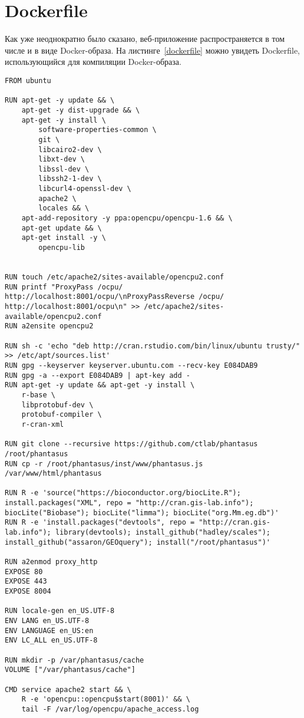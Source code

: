 \documentclass[specification,annotation]{itmo-student-thesis}
\begin{document}
\chapter{Dockerfile}
Как уже неоднократно было сказано, веб-приложение распространяется в том числе и в виде Docker-образа. На листинге~\ref{dockerfile} можно увидеть Dockerfile, использующийся для компиляции Docker-образа.
\begin{lstlisting}[float=!h,caption={Dockerfile для Docker-образа веб-приложения phantasus},label={dockerfile}]
FROM ubuntu
    
RUN apt-get -y update && \
    apt-get -y dist-upgrade && \
    apt-get -y install \
        software-properties-common \
        git \
        libcairo2-dev \
        libxt-dev \
        libssl-dev \
        libssh2-1-dev \
        libcurl4-openssl-dev \
        apache2 \
        locales && \
    apt-add-repository -y ppa:opencpu/opencpu-1.6 && \
    apt-get update && \
    apt-get install -y \
        opencpu-lib


RUN touch /etc/apache2/sites-available/opencpu2.conf
RUN printf "ProxyPass /ocpu/ http://localhost:8001/ocpu/\nProxyPassReverse /ocpu/ http://localhost:8001/ocpu\n" >> /etc/apache2/sites-available/opencpu2.conf
RUN a2ensite opencpu2

RUN sh -c 'echo "deb http://cran.rstudio.com/bin/linux/ubuntu trusty/" >> /etc/apt/sources.list'
RUN gpg --keyserver keyserver.ubuntu.com --recv-key E084DAB9
RUN gpg -a --export E084DAB9 | apt-key add -
RUN apt-get -y update && apt-get -y install \
    r-base \
    libprotobuf-dev \
    protobuf-compiler \
    r-cran-xml

RUN git clone --recursive https://github.com/ctlab/phantasus /root/phantasus
RUN cp -r /root/phantasus/inst/www/phantasus.js /var/www/html/phantasus   

RUN R -e 'source("https://bioconductor.org/biocLite.R"); install.packages("XML", repo = "http://cran.gis-lab.info"); biocLite("Biobase"); biocLite("limma"); biocLite("org.Mm.eg.db")'
RUN R -e 'install.packages("devtools", repo = "http://cran.gis-lab.info"); library(devtools); install_github("hadley/scales"); install_github("assaron/GEOquery"); install("/root/phantasus")'

RUN a2enmod proxy_http
EXPOSE 80
EXPOSE 443
EXPOSE 8004

RUN locale-gen en_US.UTF-8  
ENV LANG en_US.UTF-8  
ENV LANGUAGE en_US:en  
ENV LC_ALL en_US.UTF-8     

RUN mkdir -p /var/phantasus/cache
VOLUME ["/var/phantasus/cache"]

CMD service apache2 start && \
    R -e 'opencpu::opencpu$start(8001)' && \
    tail -F /var/log/opencpu/apache_access.log
\end{lstlisting}
\end{document}
